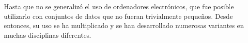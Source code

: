 \documentclass[spanish,11pt,letterpaper,oneside]{memoir}
\begin{document}
	Hasta que no se generalizó el uso de ordenadores electrónicos, que fue posible utilizarlo con conjuntos de datos que no fueran trivialmente pequeños. Desde entonces, su uso se ha multiplicado y se han desarrollado numerosas variantes en muchas disciplinas diferentes.
	
\end{document}
